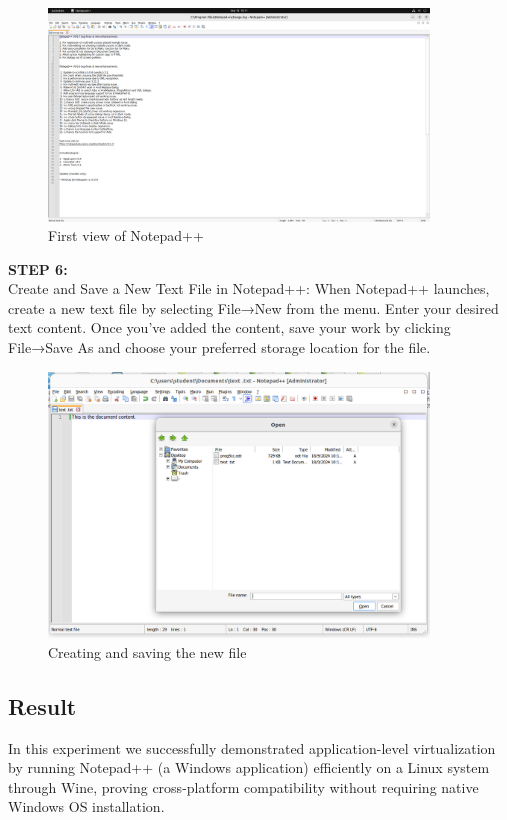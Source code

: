 \documentclass[12pt]{article}
\begin{document}
\begin{spacing}{1.5}
\begin{adjustwidth}{0cm}{0cm}
\begin{justify}
\begin{figure}[H]
    \centering
    \includegraphics[width=0.9\textwidth]{exp 4/Screenshot from 2024-09-18 10-11-28.png}
    \caption{First view of Notepad++}
    \label{fig: 1}
\end{figure}

\textbf{STEP 6:} \\
Create and Save a New Text File in Notepad++: When Notepad++ launches, create a new text file by selecting File→New from the menu. Enter your desired text content. Once you've added the content, save your work by clicking File→Save As and choose your preferred storage location for the file.

\begin{figure}[H]
    \centering
    \includegraphics[width=0.9\textwidth]{exp 4/image3.png}
    \caption{Creating and saving the new file}
    \label{fig: 1}
\end{figure}

\subsection{Result} 
In this experiment we successfully demonstrated application-level virtualization by running Notepad++ (a Windows application) efficiently on a Linux system through Wine, proving cross-platform compatibility without requiring native Windows OS installation.


\end{justify}
\end{adjustwidth}
\end{spacing}
\end{document}
